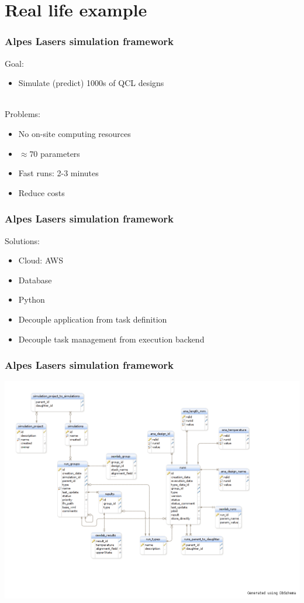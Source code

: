 \documentclass[14pt]{beamer}
\begin{document}
\section{Real life example}
\begin{frame}
\frametitle{Alpes Lasers simulation framework}
Goal:
\begin{itemize}
\item Simulate (predict) 1000s of QCL designs
\end{itemize}
~\\Problems:
\begin{itemize}
\item No on-site computing resources
\item $\approx70$ parameters
\item Fast runs: 2-3 minutes
\item Reduce costs
\end{itemize}
\end{frame}

\begin{frame}
\frametitle{Alpes Lasers simulation framework}
Solutions:
\begin{itemize}
\item Cloud: AWS
\item Database
\item Python
\item Decouple application from task definition
\item Decouple task management from execution backend
\end{itemize}
\end{frame}

\begin{frame}
\frametitle{Alpes Lasers simulation framework}
\includegraphics[width=1.3\textwidth]{simudb}
\end{frame}
\end{document}
